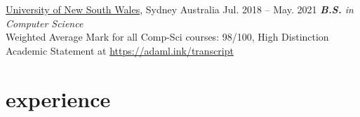 \documentclass[hidelinks__VERSION__]{adamyi-cv}
\begin{document}
\begin{entrylist}


\entry
{\href{https://unsw.edu.au}{University of New South Wales}, Sydney Australia}
{Jul. 2018 -- May. 2021}
{\emph{\textbf{B.S.} in Computer Science}\\
Weighted Average Mark for all Comp-Sci courses: 98/100, High Distinction\\
Academic Statement at \href{https://adaml.ink/transcript}{https://adaml.ink/transcript}
}

\end{entrylist}


\section{experience}
\end{document}
